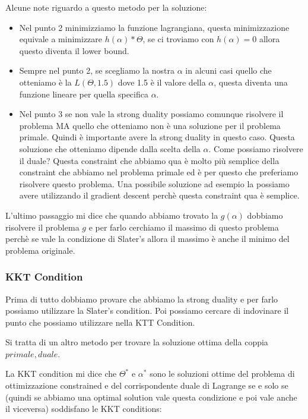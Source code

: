 \documentclass[14pt]{extreport}
\begin{document}
Alcune note riguardo a questo metodo per la soluzione:
\begin{itemize}
	\item Nel punto 2 minimizziamo la funzione lagrangiana, questa minimizzazione equivale a minimizzare $h(\alpha)*\Theta$, se ci troviamo con
	$h(\alpha) = 0$ allora questo diventa il lower bound.
	\item Sempre nel punto 2, se scegliamo la nostra $\alpha$ in alcuni casi quello che otteniamo è la $L(\Theta, 1.5)$ dove 1.5 è il valore della
	      $\alpha$, questa diventa una funzione lineare per quella specifica $\alpha$.
	\item Nel punto 3 se non vale la strong duality possiamo comunque risolvere il problema MA quello che otteniamo non è una soluzione per il
	      problema primale. Quindi è importante avere la strong duality in questo caso. Questa soluzione che otteniamo dipende dalla scelta della
	      $\alpha$. Come possiamo risolvere il duale? Questa constraint che abbiamo qua è molto più semplice della constraint che abbiamo nel problema
	      primale ed è per questo che preferiamo risolvere questo problema. Una possibile soluzione ad esempio la possiamo avere utilizzando il
	      gradient descent perchè questa constraint qua è semplice.
\end{itemize}



L'ultimo passaggio mi dice che quando abbiamo trovato la $g(\alpha)$ dobbiamo risolvere il problema $g$ e per farlo cerchiamo il massimo di questo
problema perchè se vale la condizione di Slater's allora il massimo è anche il minimo del problema originale.

\subsubsection{KKT Condition}

Prima di tutto dobbiamo provare che abbiamo la strong duality e per farlo possiamo utilizzare la Slater's condition. Poi possiamo cercare di
indovinare il punto che possiamo utilizzare nella KTT Condition.

Si tratta di un altro metodo per trovare la soluzione ottima della coppia $primale, duale$.

La KKT condition mi dice che $\Theta^*$ e $\alpha^*$ sono le soluzioni ottime del problema di ottimizzazione constrained e del corrispondente duale di
Lagrange se e solo se (quindi se abbiamo una optimal solution vale questa condizione e poi vale anche il viceversa) soddisfano le KKT conditions:
\end{document}
